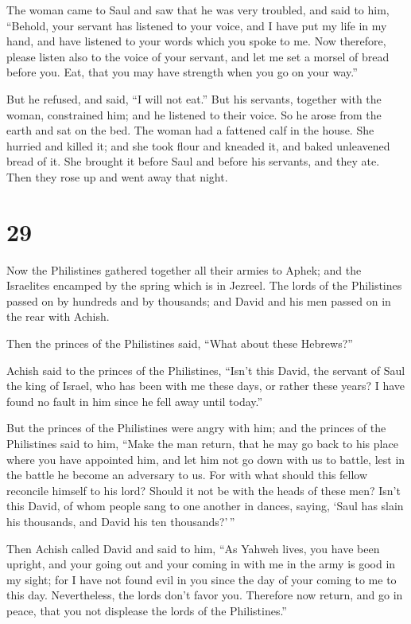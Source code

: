  The woman came to Saul and saw that he was very
troubled, and said to him, ``Behold, your servant has listened to your
voice, and I have put my life in my hand, and have listened to your
words which you spoke to me.  Now therefore, please
listen also to the voice of your servant, and let me set a morsel of
bread before you. Eat, that you may have strength when you go on your
way.''

 But he refused, and said, ``I will not eat.'' But his
servants, together with the woman, constrained him; and he listened to
their voice. So he arose from the earth and sat on the bed.
 The woman had a fattened calf in the house. She hurried
and killed it; and she took flour and kneaded it, and baked unleavened
bread of it.  She brought it before Saul and before his
servants, and they ate. Then they rose up and went away that night.

\hypertarget{section-28}{%
\section{29}\label{section-28}}

 Now the Philistines gathered together all their armies to
Aphek; and the Israelites encamped by the spring which is in Jezreel.
 The lords of the Philistines passed on by hundreds and by
thousands; and David and his men passed on in the rear with Achish.

 Then the princes of the Philistines said, ``What about
these Hebrews?''

Achish said to the princes of the Philistines, ``Isn't this David, the
servant of Saul the king of Israel, who has been with me these days, or
rather these years? I have found no fault in him since he fell away
until today.''

 But the princes of the Philistines were angry with him;
and the princes of the Philistines said to him, ``Make the man return,
that he may go back to his place where you have appointed him, and let
him not go down with us to battle, lest in the battle he become an
adversary to us. For with what should this fellow reconcile himself to
his lord? Should it not be with the heads of these men? 
Isn't this David, of whom people sang to one another in dances, saying,
`Saul has slain his thousands, and David his ten thousands?'\,''

 Then Achish called David and said to him, ``As Yahweh
lives, you have been upright, and your going out and your coming in with
me in the army is good in my sight; for I have not found evil in you
since the day of your coming to me to this day. Nevertheless, the lords
don't favor you.  Therefore now return, and go in peace,
that you not displease the lords of the Philistines.''

